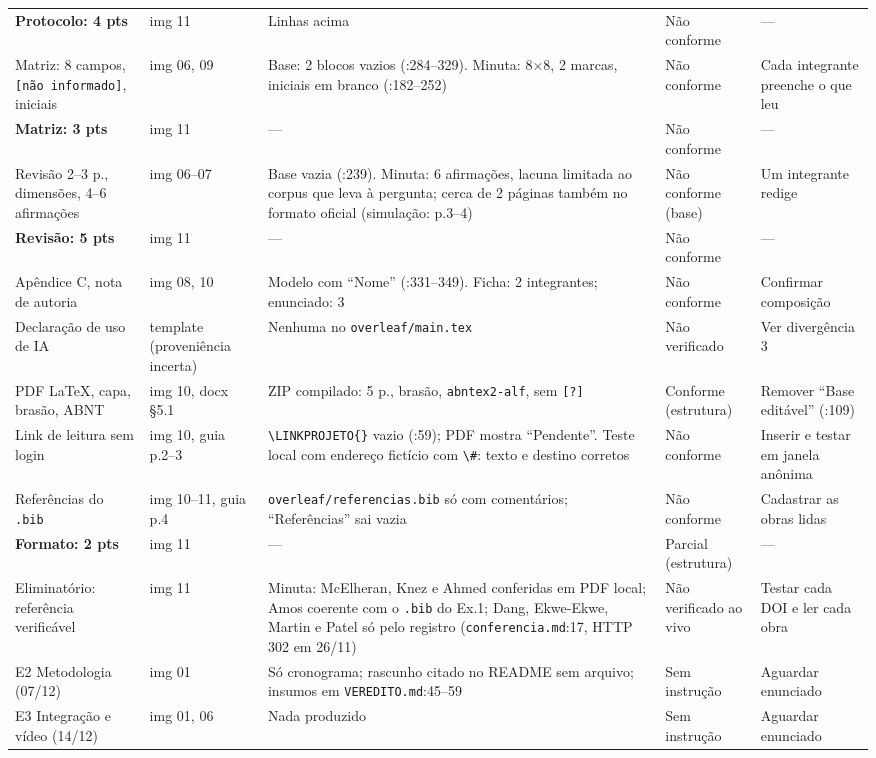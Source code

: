\documentclass[11pt,a4paper]{article}
\newcommand{\arq}[1]{\nolinkurl{#1}}
\begin{document}
{\begin{longtable}{@{}P{2.9cm}P{1.5cm}P{5.2cm}P{2.0cm}P{3.3cm}@{}}
\textbf{Protocolo: 4 pts} & img 11 & Linhas acima & Não conforme & --- \\
Matriz: 8 campos, \texttt{[não informado]}, iniciais & img 06, 09 & Base: 2 blocos vazios (:284--329). Minuta: 8$\times$8, 2 marcas, iniciais em branco (:182--252) & Não conforme & Cada integrante preenche o que leu \\
\textbf{Matriz: 3 pts} & img 11 & --- & Não conforme & --- \\
Revisão 2--3 p., dimensões, 4--6 afirmações & img 06--07 & Base vazia (:239). Minuta: 6 afirmações, lacuna limitada ao corpus que leva à pergunta; cerca de 2 páginas também no formato oficial (simulação: p.3--4) & Não conforme (base) & Um integrante redige \\
\textbf{Revisão: 5 pts} & img 11 & --- & Não conforme & --- \\
Apêndice C, nota de autoria & img 08, 10 & Modelo com ``Nome'' (:331--349). Ficha: 2 integrantes; enunciado: 3 & Não conforme & Confirmar composição \\
Declaração de uso de IA & template (proveniência incerta) & Nenhuma no \arq{overleaf/main.tex} & Não verificado & Ver divergência 3 \\
PDF LaTeX, capa, brasão, ABNT & img 10, docx §5.1 & ZIP compilado: 5 p., brasão, \texttt{abntex2-alf}, sem \texttt{[?]} & Conforme (estrutura) & Remover ``Base editável'' (:109) \\
Link de leitura sem login & img 10, guia p.2--3 & \texttt{\textbackslash LINKPROJETO\{\}} vazio (:59); PDF mostra ``Pendente''. Teste local com endereço fictício com \texttt{\textbackslash\#}: texto e destino corretos & Não conforme & Inserir e testar em janela anônima \\
Referências do \texttt{.bib} & img 10--11, guia p.4 & \arq{overleaf/referencias.bib} só com comentários; ``Referências'' sai vazia & Não conforme & Cadastrar as obras lidas \\
\textbf{Formato: 2 pts} & img 11 & --- & Parcial (estrutura) & --- \\
Eliminatório: referência verificável & img 11 & Minuta: McElheran, Knez e Ahmed conferidas em PDF local; Amos coerente com o \texttt{.bib} do Ex.1; Dang, Ekwe-Ekwe, Martin e Patel só pelo registro (\arq{conferencia.md}:17, HTTP 302 em 26/11) & Não verificado ao vivo & Testar cada DOI e ler cada obra \\
E2 Metodologia (07/12) & img 01 & Só cronograma; rascunho citado no README sem arquivo; insumos em \arq{VEREDITO.md}:45--59 & Sem instrução & Aguardar enunciado \\
E3 Integração e vídeo (14/12) & img 01, 06 & Nada produzido & Sem instrução & Aguardar enunciado \\
\bottomrule
\end{longtable}
}
\end{document}
